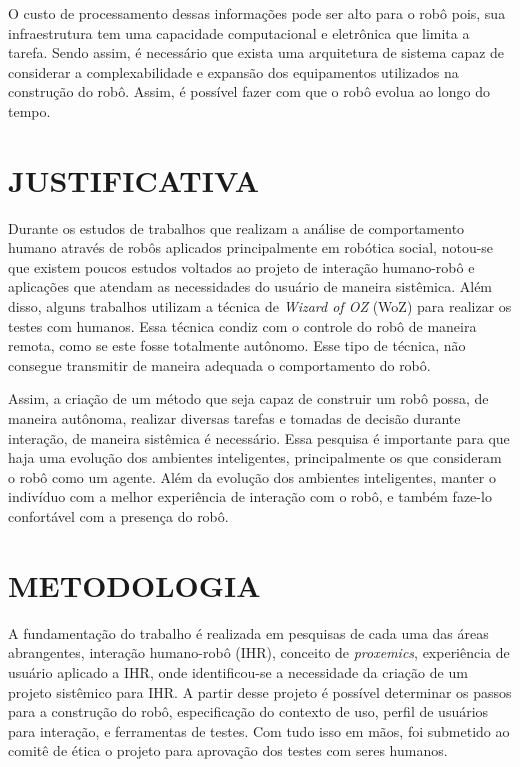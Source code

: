 O custo de processamento dessas informações pode ser alto para o robô pois, sua infraestrutura tem uma capacidade computacional e eletrônica que limita a tarefa. Sendo assim, é necessário que exista uma arquitetura de sistema capaz de considerar a complexabilidade e expansão dos equipamentos utilizados na construção do robô. Assim, é possível fazer com que o robô evolua ao longo do tempo.

\section{JUSTIFICATIVA}
Durante os estudos de trabalhos que realizam a análise de comportamento humano através de robôs aplicados principalmente em robótica social, notou-se que existem poucos estudos voltados ao projeto de interação humano-robô e aplicações que atendam as necessidades do usuário de maneira sistêmica. Além disso, alguns trabalhos utilizam a técnica de \emph{Wizard of OZ} (WoZ) para realizar os testes com humanos. Essa técnica condiz com o controle do robô de maneira remota, como se este fosse totalmente autônomo. Esse tipo de técnica, não consegue transmitir de maneira adequada o comportamento do robô.

Assim, a criação de um método que seja capaz de construir um robô possa, de maneira autônoma, realizar diversas tarefas e tomadas de decisão durante interação, de maneira sistêmica é necessário. Essa pesquisa é importante para que haja uma evolução dos ambientes inteligentes, principalmente os que consideram o robô como um agente. Além da evolução dos ambientes inteligentes, manter o indivíduo com a melhor experiência de interação com o robô, e também faze-lo confortável com a presença do robô.

\section{METODOLOGIA}
A fundamentação do trabalho é realizada em pesquisas de cada uma das áreas abrangentes, interação humano-robô (IHR), conceito de \emph{proxemics}, experiência de usuário aplicado a IHR, onde identificou-se a necessidade da criação de um projeto sistêmico para IHR. A partir desse projeto é possível determinar os passos para a construção do robô, especificação do contexto de uso, perfil de usuários para interação, e ferramentas de testes. Com tudo isso em mãos, foi submetido ao comitê de ética o projeto para aprovação dos testes com seres humanos.

